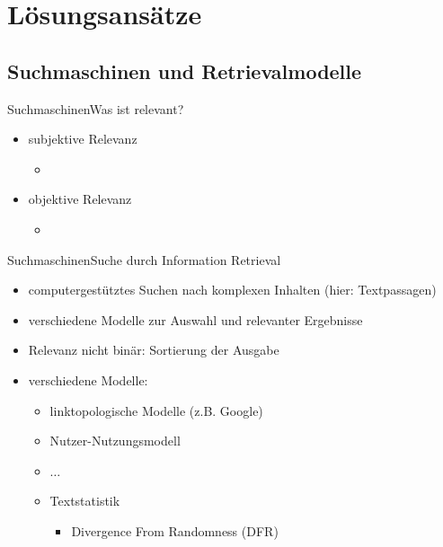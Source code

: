 \documentclass{beamer}
\begin{document}
	\section{Lösungsansätze}
	\subsection{Suchmaschinen und Retrievalmodelle}
	\begin{frame}{Suchmaschinen}{Was ist relevant?}
		\begin{itemize}
			\item subjektive Relevanz
			\begin{itemize}
				\item %
			\end{itemize}
			\item objektive Relevanz
			\begin{itemize}
				\item %
			\end{itemize}
		\end{itemize}
	\end{frame}


	\begin{frame}{Suchmaschinen}{Suche durch Information Retrieval}
		\begin{itemize}[<+->]
			\item computergestütztes Suchen nach komplexen Inhalten (hier: Textpassagen)
			\item verschiedene Modelle zur Auswahl und relevanter Ergebnisse
			\item Relevanz nicht binär: Sortierung der Ausgabe
			\item verschiedene Modelle:
			\begin{itemize}
				\item linktopologische Modelle (z.B. Google)
				\item Nutzer-Nutzungsmodell
				\item $\ldots$
				\item Textstatistik
				\begin{itemize}
					\item Divergence From Randomness (DFR)
				\end{itemize}
			\end{itemize}
		\end{itemize}
	\end{frame}
\end{document}
